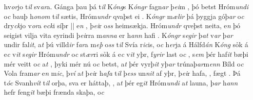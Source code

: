 hv\textit{or}jo    t\textit{il} sv\textit{ar}a. Gánga þau þá   t\textit{il} K\textit{óng}s  K\textit{óngr} fagn\textit{ar}
þ\textit{ei}m  , 
þó betst Hróm\textit{undi} o\textit{c} bauþ h\textit{onom} t\textit{il}
sætis,   
Hróm\textit{undr} qvaþst ei   . K\textit{óngr} m\textit{ælir} þá   þyggja góþ\textit{ar}  o\textit{c} dry\textit{ck}jo v\textit{or}a e\textit{ck}i síþr || e\textit{n} , þ\textit{ei}r   o\textit{ss} heimsækja. Hróm\textit{undr} qveþst   neita, e\textit{n} þó seigist   vilja vita eyrindi þ\textit{ei}rra  m\textit{anna} er
h\textit{ann} hafi   . K\textit{óngr} s\textit{egir} þ\textit{at} v\textit{ar} þ\textit{ar}
undir  fal\textit{it}, a\textit{t} þú villd\textit{ir} f\textit{ar}a
m\textit{eþ} o\textit{ss} t\textit{il} Svía r\textit{ic}is,
o\textit{c} h\textit{er}ja á Hálfd\textit{án} K\textit{óng}  sỏk á e\textit{c} 
v\textit{it}   
s\textit{egir} Hróm\textit{undr} o\textit{c} st\textit{ær}ri sỏk á e\textit{c} v\textit{it} yþr, f\textit{yrir} last o\textit{c} , s\textit{em} þér haf\textit{it} bæþi mér  veitt o\textit{c}
a\textit{t} , þyki mér nú o\textit{c} betst, a\textit{t} þér vyrþ\textit{it} yþ\textit{ar} trúnaþ\textit{ar}m\textit{enn}  Bíld o\textit{c} Vola fram\textit{ar} e\textit{n} m\textit{ic}, þ\textit{ví} a\textit{t}
þ\textit{ei}r h\textit{afa} t\textit{il} þ\textit{ess} un\textit{n}\textit{it} af yþr,   þ\textit{ei}r hafa,  , fægt  .  Þá t\textit{óc} Svanh\textit{vít} t\textit{il} orþa,   sva er   háttaþ,  , a\textit{t} þér eg\textit{it} Hróm\textit{undi}  a\textit{t} launa, þ\textit{ar}  h\textit{ann} hefr feng\textit{it} bæþi frænda skaþa, o\textit{c}
